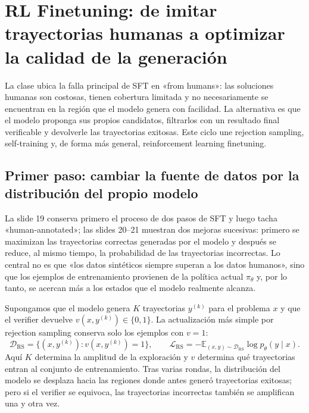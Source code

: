 \section{RL Finetuning: de imitar trayectorias humanas a optimizar la calidad de la generación}

La clase ubica la falla principal de SFT en «from humans»: las soluciones humanas son costosas, tienen cobertura limitada y no necesariamente se encuentran en la región que el modelo genera con facilidad. La alternativa es que el modelo proponga sus propios candidatos, filtrarlos con un resultado final verificable y devolverle las trayectorias exitosas. Este ciclo une rejection sampling, self-training y, de forma más general, reinforcement learning finetuning.

\subsection{Primer paso: cambiar la fuente de datos por la distribución del propio modelo}

La slide 19 conserva primero el proceso de dos pasos de SFT y luego tacha «human-annotated»; las slides 20--21 muestran dos mejoras sucesivas: primero se maximizan las trayectorias correctas generadas por el modelo y después se reduce, al mismo tiempo, la probabilidad de las trayectorias incorrectas. Lo central no es que «los datos sintéticos siempre superan a los datos humanos», sino que los ejemplos de entrenamiento provienen de la política actual $\pi_\theta$ y, por lo tanto, se acercan más a los estados que el modelo realmente alcanza.




Supongamos que el modelo genera $K$ trayectorias $y^{(k)}$ para el problema $x$ y que el verifier devuelve $v(x,y^{(k)})\in\{0,1\}$. La actualización más simple por rejection sampling conserva solo los ejemplos con $v=1$:
\[
\mathcal D_{\text{RS}}=\{(x,y^{(k)}):v(x,y^{(k)})=1\},
\qquad
\mathcal L_{\text{RS}}=-\mathbb E_{(x,y)\sim\mathcal D_{\text{RS}}}\log p_\theta(y\mid x).
\]
Aquí $K$ determina la amplitud de la exploración y $v$ determina qué trayectorias entran al conjunto de entrenamiento. Tras varias rondas, la distribución del modelo se desplaza hacia las regiones donde antes generó trayectorias exitosas; pero si el verifier se equivoca, las trayectorias incorrectas también se amplifican una y otra vez.

